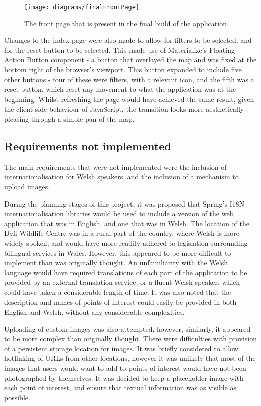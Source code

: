 \begin{figure}[H]
	\texttt{[image: diagrams/finalFrontPage]}
	\caption{The front page that is present in the final build of the application.}
\end{figure}

Changes to the index page were also made to allow for filters to be selected, and for the reset button to be selected. This made use of Materialize's Floating Action Button component - a button that overlayed the map and was fixed at the bottom right of the browser's viewport. This button expanded to include five other buttons - four of these were filters, with a relevant icon, and the fifth was a reset button, which reset any movement to what the application was at the beginning. Whilst refreshing the page would have achieved the same result, given the client-side behaviour of JavaScript, the transition looks more aesthetically pleasing through a simple pan of the map.

\subsection{Requirements not implemented}

The main requirements that were not implemented were the inclusion of internationalisation for Welsh speakers, and the inclusion of a mechanism to upload images.

During the planning stages of this project, it was proposed that Spring's I18N internationalisation libraries would be used to include a version of the web application that was in English, and one that was in Welsh. The location of the Dyfi Wildlife Centre was in a rural part of the country, where Welsh is more widely-spoken, and would have more readily adhered to legislation surrounding bilingual services in Wales. However, this appeared to be more difficult to implement than was originally thought. An unfamiliarity with the Welsh language would have required translations of each part of the application to be provided by an external translation service, or a fluent Welsh speaker, which could have taken a considerable length of time. It was also noted that the description and names of points of interest could easily be provided in both English and Welsh, without any considerable complexities.

Uploading of custom images was also attempted, however, similarly, it appeared to be more complex than originally thought. There were difficulties with provision of a persistent storage location for images. It was briefly considered to allow hotlinking of URLs from other locations, however it was unlikely that most of the images that users would want to add to points of interest would have not been photographed by themselves. It was decided to keep a placeholder image with each point of interest, and ensure that textual information was as visible as possible.

